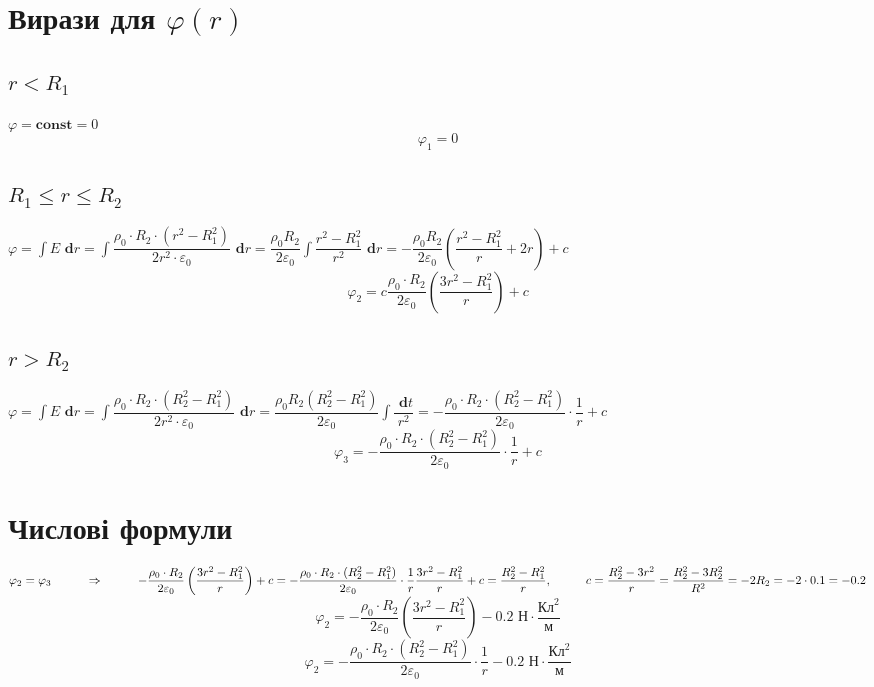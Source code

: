 \documentclass[a4paper,12pt]{article}
\newcommand\tab[1][1cm]{\hspace*{#1}}
\newcommand\dd{\textbf{ d}}
\newcommand\const{\textbf{const}}
\begin{document}
\begin{justify}
	\section{Вирази для $\varphi(r)$}
	\subsection{$r<R_1$}
	$\varphi=\const=0$
	\begin{equation}
		\varphi_1=0
	\end{equation}
	\subsection{$R_1\leq r\leq R_2$}
	$\varphi=\displaystyle\int E\dd r=\displaystyle\int\dfrac{\rho_0\cdot R_2\cdot(r^2-R^2_1)}{2r^2\cdot\varepsilon_0}\dd r=\dfrac{\rho_0R_2}{2\varepsilon_0}\displaystyle\int\dfrac{r^2-R_1^2}{r^2}\dd r=-\dfrac{\rho_0R_2}{2\varepsilon_0}\left(\dfrac{r^2-R_1^2}{r}+2r\right)+c$
	\begin{equation}
		\varphi_2=c\dfrac{\rho_0\cdot R_2}{2\varepsilon_0}\left(\dfrac{3r^2-R_1^2}{r}\right)+c
	\end{equation}
	\subsection{$r>R_2$}
	$\varphi=\displaystyle\int E\dd r=\displaystyle\int\dfrac{\rho_0\cdot R_2\cdot(R_2^2-R_1^2)}{2r^2\cdot\varepsilon_0}\dd r=\dfrac{\rho_0R_2(R_2^2-R_1^2)}{2\varepsilon_0}\displaystyle\int\dfrac{\dd t}{r^2}=-\dfrac{\rho_0\cdot R_2\cdot(R_2^2-R_1^2)}{2\varepsilon_0}\cdot\dfrac{1}{r}+c$
	\begin{equation}
		\varphi_3=-\dfrac{\rho_0\cdot R_2\cdot(R_2^2-R_1^2)}{2\varepsilon_0}\cdot\dfrac{1}{r}+c
	\end{equation}
	\section{Числові формули}
	$\varphi_2=\varphi_3\tab\Rightarrow\tab -\dfrac{\rho_0\cdot R_2}{2\varepsilon_0}\left(\dfrac{3r^2-R_1^2}{r}\right)+c=-\dfrac{\rho_0\cdot R_2\cdot(R_2^2-R_1^2)}{2\varepsilon_0}\cdot\dfrac{1}{r}\\\dfrac{3r^2-R_1^2}{r}+c=\dfrac{R_2^2-R_1^2}{r},\tab c=\dfrac{R_2^2-3r^2}{r}=\dfrac{R_2^2-3R_2^2}{R^2}=-2R_2=-2\cdot0.1=-0.2$
	\begin{equation}
		\varphi_2=-\dfrac{\rho_0\cdot R_2}{2\varepsilon_0}\left(\dfrac{3r^2-R_1^2}{r}\right)-0.2\textrm{ Н}\cdot\dfrac{\textrm{Кл}^2}{\textrm{м}}
	\end{equation}
	\begin{equation}
		\varphi_2=-\dfrac{\rho_0\cdot R_2\cdot(R_2^2-R_1^2)}{2\varepsilon_0}\cdot\dfrac{1}{r}-0.2\textrm{ Н}\cdot\dfrac{\textrm{Кл}^2}{\textrm{м}}
	\end{equation}

\end{justify}
\end{document}
